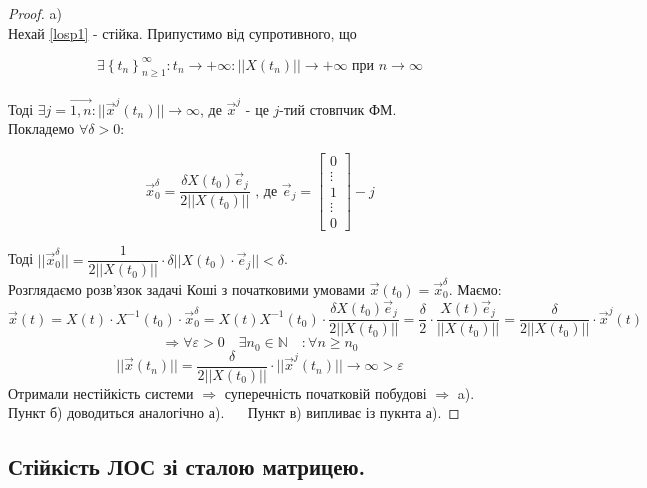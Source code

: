 \documentclass[14pt,a4paper]{scrartcl}
\theoremstyle{definition}
\theoremstyle{definition}
\theoremstyle{definition}
\begin{document}
\begin{proof}
a) \fbox{$\Longrightarrow$} \\ Нехай \eqref{losp1} - стійка. Припустимо від супротивного, що

$$\exists  \left\lbrace t_n \right\rbrace_{n\geq 1}^{\infty} : t_n \rightarrow +\infty : ||X(t_n)|| \to {+\infty} \text{ при } n \to \infty$$\\
Тоді $\exists j = \overrightarrow{1, n} : || \overrightarrow{x}^{j} (t_n)|| \to \infty$, де $\overrightarrow{x}^j$  - це $j$-тий стовпчик ФМ. \\ Покладемо $\forall \delta > 0:$


$$
\overrightarrow{x}^{\delta}_0 = \frac{\delta X(t_0) \overrightarrow{e}_j}{2 ||X(t_0)||} \text{ , де }\overrightarrow{e}_j = \begin{bmatrix}
0\\
\vdots\\
1\\
\vdots\\
0
\end{bmatrix} - j
$$

Тоді $|| \overrightarrow{x}_0^{\delta}|| = \dfrac{1}{ 2 ||X(t_0)||}  \cdot \delta ||X(t_0) \cdot \overrightarrow{e}_j|| < \delta $.\\
Розглядаємо розв'язок задачі Коші з початковими умовами $ \overrightarrow{x} (t_0) = \overrightarrow{x} _0 ^ \delta$. Маємо:
$$
\overrightarrow{x} (t) = X(t) \cdot X^{-1}(t_0) \cdot \overrightarrow{x}_0 ^\delta = X(t) X^{-1} (t_0) \cdot \dfrac{ \delta X(t_0) \overrightarrow{e}_j}{ 2 ||X(t_0)||} = \frac{\delta}{2} \cdot \frac{X(t) \overrightarrow{e}_j}{ ||X(t_0)||} = \frac{\delta}{2 ||X(t_0)|| } \cdot \overrightarrow{x}^j (t)
$$
$$
\Longrightarrow \forall \varepsilon >0 \quad \exists n_0 \in \mathbb{N} \quad : \forall n \geq n_0
$$
$$
||\overrightarrow{x} (t_n)|| = \frac{\delta}{ 2 ||X(t_0)|| } \cdot ||\overrightarrow{x}^j (t_n)|| \to \infty > \varepsilon
$$
Отримали нестійкість системи $ \Rightarrow  $ суперечність початковій побудові $ \Rightarrow$ a).\\
Пункт б) доводиться аналогічно а). $\quad$ Пункт в) випливає із пукнта а).
\end{proof}

\subsection{Стійкість ЛОС зі сталою матрицею.}
\end{document}
